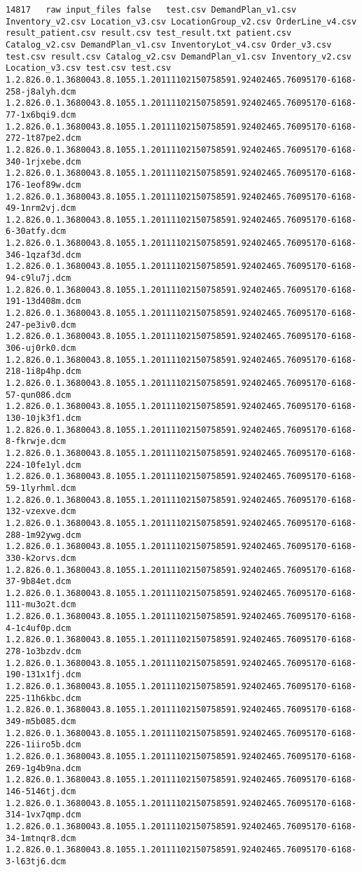 \begin{lstlisting}
14817	raw	input_files	false	test.csv DemandPlan_v1.csv Inventory_v2.csv Location_v3.csv LocationGroup_v2.csv OrderLine_v4.csv result_patient.csv result.csv test_result.txt patient.csv Catalog_v2.csv DemandPlan_v1.csv InventoryLot_v4.csv Order_v3.csv test.csv result.csv Catalog_v2.csv DemandPlan_v1.csv Inventory_v2.csv Location_v3.csv test.csv test.csv 1.2.826.0.1.3680043.8.1055.1.20111102150758591.92402465.76095170-6168-258-j8alyh.dcm 1.2.826.0.1.3680043.8.1055.1.20111102150758591.92402465.76095170-6168-77-1x6bqi9.dcm 1.2.826.0.1.3680043.8.1055.1.20111102150758591.92402465.76095170-6168-272-1t87pe2.dcm 1.2.826.0.1.3680043.8.1055.1.20111102150758591.92402465.76095170-6168-340-1rjxebe.dcm 1.2.826.0.1.3680043.8.1055.1.20111102150758591.92402465.76095170-6168-176-1eof89w.dcm 1.2.826.0.1.3680043.8.1055.1.20111102150758591.92402465.76095170-6168-49-1nrm2vj.dcm 1.2.826.0.1.3680043.8.1055.1.20111102150758591.92402465.76095170-6168-6-30atfy.dcm 1.2.826.0.1.3680043.8.1055.1.20111102150758591.92402465.76095170-6168-346-1qzaf3d.dcm 1.2.826.0.1.3680043.8.1055.1.20111102150758591.92402465.76095170-6168-94-c9lu7j.dcm 1.2.826.0.1.3680043.8.1055.1.20111102150758591.92402465.76095170-6168-191-13d408m.dcm 1.2.826.0.1.3680043.8.1055.1.20111102150758591.92402465.76095170-6168-247-pe3iv0.dcm 1.2.826.0.1.3680043.8.1055.1.20111102150758591.92402465.76095170-6168-306-uj0rk0.dcm 1.2.826.0.1.3680043.8.1055.1.20111102150758591.92402465.76095170-6168-218-1i8p4hp.dcm 1.2.826.0.1.3680043.8.1055.1.20111102150758591.92402465.76095170-6168-57-qun086.dcm 1.2.826.0.1.3680043.8.1055.1.20111102150758591.92402465.76095170-6168-130-10jk3f1.dcm 1.2.826.0.1.3680043.8.1055.1.20111102150758591.92402465.76095170-6168-8-fkrwje.dcm 1.2.826.0.1.3680043.8.1055.1.20111102150758591.92402465.76095170-6168-224-10fe1yl.dcm 1.2.826.0.1.3680043.8.1055.1.20111102150758591.92402465.76095170-6168-59-1lyrhml.dcm 1.2.826.0.1.3680043.8.1055.1.20111102150758591.92402465.76095170-6168-132-vzexve.dcm 1.2.826.0.1.3680043.8.1055.1.20111102150758591.92402465.76095170-6168-288-1m92ywg.dcm 1.2.826.0.1.3680043.8.1055.1.20111102150758591.92402465.76095170-6168-330-k2orvs.dcm 1.2.826.0.1.3680043.8.1055.1.20111102150758591.92402465.76095170-6168-37-9b84et.dcm 1.2.826.0.1.3680043.8.1055.1.20111102150758591.92402465.76095170-6168-111-mu3o2t.dcm 1.2.826.0.1.3680043.8.1055.1.20111102150758591.92402465.76095170-6168-4-1c4uf0p.dcm 1.2.826.0.1.3680043.8.1055.1.20111102150758591.92402465.76095170-6168-278-1o3bzdv.dcm 1.2.826.0.1.3680043.8.1055.1.20111102150758591.92402465.76095170-6168-190-131x1fj.dcm 1.2.826.0.1.3680043.8.1055.1.20111102150758591.92402465.76095170-6168-225-11h6kbc.dcm 1.2.826.0.1.3680043.8.1055.1.20111102150758591.92402465.76095170-6168-349-m5b085.dcm 1.2.826.0.1.3680043.8.1055.1.20111102150758591.92402465.76095170-6168-226-1iiro5b.dcm 1.2.826.0.1.3680043.8.1055.1.20111102150758591.92402465.76095170-6168-269-1g4b9na.dcm 1.2.826.0.1.3680043.8.1055.1.20111102150758591.92402465.76095170-6168-146-5146tj.dcm 1.2.826.0.1.3680043.8.1055.1.20111102150758591.92402465.76095170-6168-314-1vx7qmp.dcm 1.2.826.0.1.3680043.8.1055.1.20111102150758591.92402465.76095170-6168-34-1mtnqr8.dcm 1.2.826.0.1.3680043.8.1055.1.20111102150758591.92402465.76095170-6168-3-l63tj6.dcm 
\end{lstlisting}
